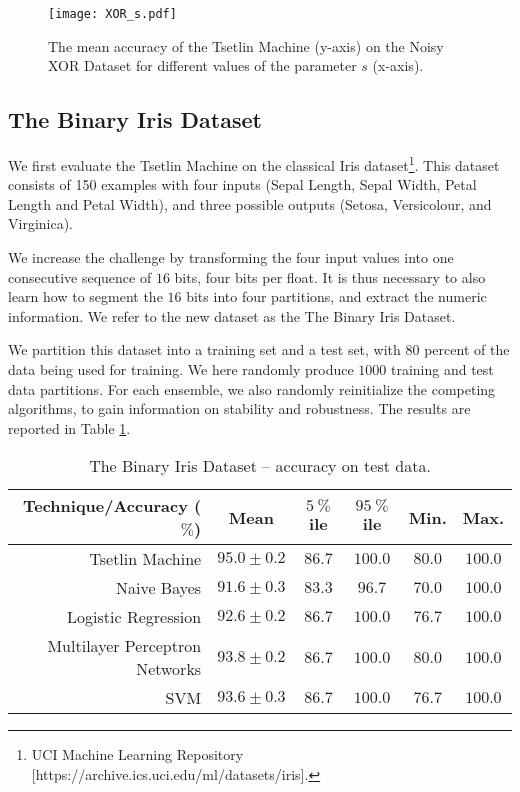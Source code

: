 \documentclass[11pt,a4paper]{article}
\begin{document}
\begin{figure}[!ht]
\centering
\texttt{[image: XOR\_s.pdf]}
\caption{The mean accuracy of the Tsetlin Machine (y-axis) on the Noisy XOR Dataset for different values of the parameter $s$ (x-axis).}
\label{figure:xor_s}
\end{figure}

\subsection{The Binary Iris Dataset}

We first evaluate the Tsetlin Machine on the classical Iris dataset\footnote{UCI Machine Learning Repository [https://archive.ics.uci.edu/ml/datasets/iris].}. This dataset consists of 150 examples with four inputs (Sepal Length, Sepal Width, Petal Length and Petal Width), and three possible outputs (Setosa, Versicolour, and Virginica).

We increase the challenge by transforming the four input values into one consecutive sequence of $16$ bits, four bits per float. It is thus necessary to also learn how to segment the $16$ bits into four partitions, and extract the numeric information. We refer to the new dataset as the The Binary Iris Dataset.

We partition this dataset into a training set and a test set, with 80 percent of the data being used for training. We here randomly produce $1000$ training and test data partitions. For each ensemble, we also randomly reinitialize the competing algorithms, to gain information on stability and robustness. The results are reported in Table \ref{tab:accuracy_binary_iris_test}.

\begin{table}[!bh]
    \centering
    \begin{tabular}{r||c|c|c|c|c}
         \bf Technique/Accuracy ($\%$)&\bf Mean&\bf $5~\%$ile &\bf $95~\%$ile&\bf Min.&\bf Max.\\
         \hline
    Tsetlin Machine&$95.0 \pm 0.2$&$86.7$&$100.0$&$80.0$&$100.0$\\
    Naive Bayes&$91.6 \pm 0.3$&$83.3$&$96.7$&$70.0$&$100.0$\\
    Logistic Regression&$92.6 \pm 0.2$&$86.7$&$100.0$&$76.7$&$100.0$\\
    Multilayer Perceptron Networks&$93.8 \pm 0.2$&$86.7$&$100.0$&$80.0$&$100.0$\\
    SVM&$93.6 \pm 0.3$&$86.7$&$100.0$&$76.7$&$100.0$
    \end{tabular}
    \caption{The Binary Iris Dataset -- accuracy on test data.}
    \label{tab:accuracy_binary_iris_test}
\end{table}
\end{document}
